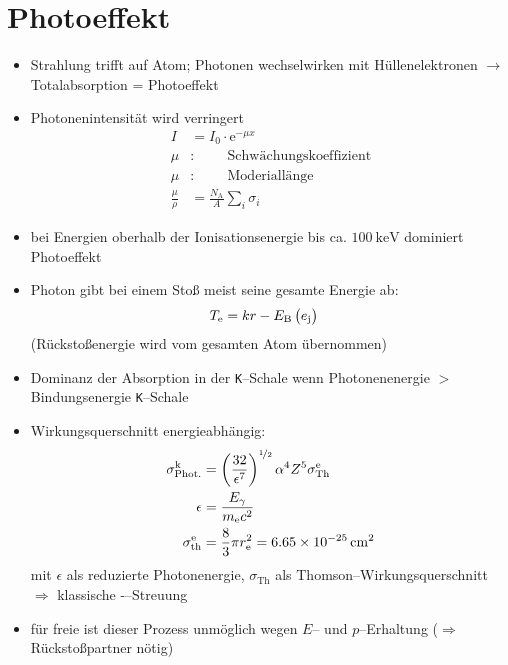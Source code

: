\documentclass[BCOR=5mm,DIV=calc,listof=totoc,headings=big]{scrartcl}
\newcommand{\lueck}{\hspace{1cm}}
\begin{document}
\section{Photoeffekt}
\label{sec:photoeffekt}
\begin{itemize}
\item Strahlung trifft auf Atom; Photonen wechselwirken mit
  Hüllenelektronen $\rightarrow$ Totalabsorption = Photoeffekt
\item Photonenintensität wird verringert
  \begin{align*}
    I&=I_{0} \cdot \mathrm{e}^{-\mu x}\\
    \mu&: \lueck \text{Schwächungskoeffizient}\\
    \mu&: \lueck \text{Moderiallänge}\\
    \frac{\mu}{\rho}&=\frac{N_{\mathrm{A}}}{A} \sum_{i} \sigma_{i}
  \end{align*}
\item bei Energien oberhalb der Ionisationsenergie bis ca.
  $\SI{100}{\keV}$ dominiert Photoeffekt
\item Photon gibt bei einem Stoß meist seine gesamte Energie ab:
  \begin{align*}
    T_{\mathrm{e}}&=kr - E_{\mathrm{B}}\del{e_{\mathrm{j}}}
  \end{align*}
  (Rückstoßenergie wird vom gesamten Atom übernommen)
\item Dominanz der Absorption in der \texttt{K}--Schale wenn
  Photonenenergie $>$ Bindungsenergie \texttt{K}--Schale
\item Wirkungsquerschnitt energieabhängig:
  \begin{align*}
    \sigma_{\text{Phot.}}^{\mathrm{k}}&=\del{\frac{32}{\epsilon^{7}}}^{\nicefrac{1}{2}}
    \alpha^{4}Z^{5}\sigma_{\text{Th}}^{\mathrm{e}}\\
    \epsilon&=\frac{E_{\gamma}}{m_{\mathrm{e}}c^{2}}\\
    \sigma_{\text{th}}^{\mathrm{e}}&=\frac{8}{3}\pi r_{\mathrm{e}}^{2}=\SI{6,65E-25}{\centi\metre\squared}
  \end{align*}
  mit $\epsilon$ als reduzierte Photonenergie, $\sigma_{\text{Th}}$
  als Thomson--Wirkungsquerschnitt $\Rightarrow$ klassische \Pelectron-\Pphoton--Streuung
\item für freie \Pelectron ist dieser Prozess unmöglich wegen $E$--
  und $p$--Erhaltung ($\Rightarrow$ Rückstoßpartner nötig)
\end{itemize}
\end{document}
